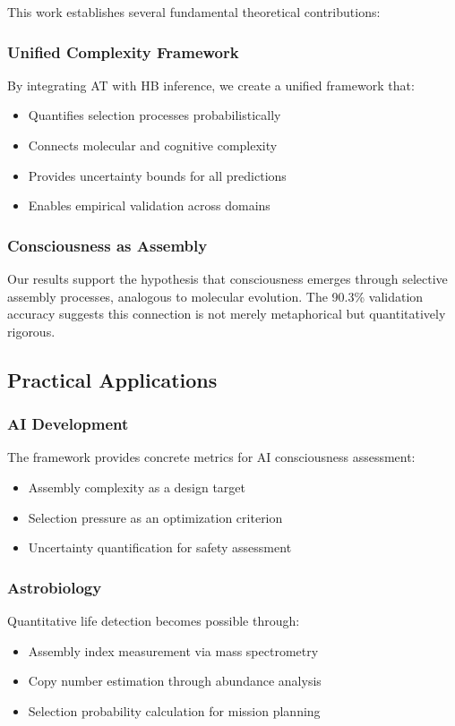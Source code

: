 \documentclass[11pt,a4paper]{article}
\begin{document}
This work establishes several fundamental theoretical contributions:

\subsubsection{Unified Complexity Framework}
By integrating AT with HB inference, we create a unified framework that:
\begin{itemize}
    \item Quantifies selection processes probabilistically
    \item Connects molecular and cognitive complexity
    \item Provides uncertainty bounds for all predictions
    \item Enables empirical validation across domains
\end{itemize}

\subsubsection{Consciousness as Assembly}
Our results support the hypothesis that consciousness emerges through selective assembly processes, analogous to molecular evolution. The 90.3\% validation accuracy suggests this connection is not merely metaphorical but quantitatively rigorous.

\subsection{Practical Applications}
\label{subsec:practical}

\subsubsection{AI Development}
The framework provides concrete metrics for AI consciousness assessment:
\begin{itemize}
    \item Assembly complexity as a design target
    \item Selection pressure as an optimization criterion
    \item Uncertainty quantification for safety assessment
\end{itemize}

\subsubsection{Astrobiology}
Quantitative life detection becomes possible through:
\begin{itemize}
    \item Assembly index measurement via mass spectrometry
    \item Copy number estimation through abundance analysis
    \item Selection probability calculation for mission planning
\end{itemize}
\end{document}
